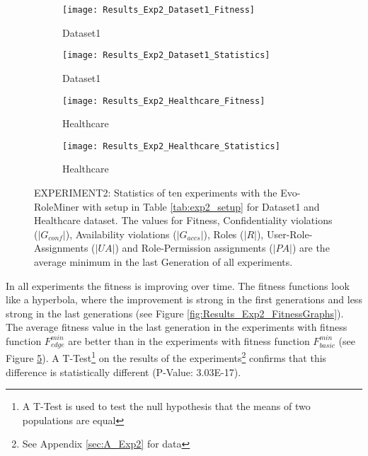\begin{figure}[H]
	\centering
	\begin{subfigure}{0.45\textwidth}
		\texttt{[image: Results\_Exp2\_Dataset1\_Fitness]}
		\caption{Dataset1}
		\label{fig:Results_Exp2_Dataset1_Fitness}
	\end{subfigure}%
	\begin{subfigure}{0.55\textwidth}
		\centering
		\texttt{[image: Results\_Exp2\_Dataset1\_Statistics]}
		\caption{Dataset1}
		\label{fig:Results_Exp2_Dataset1_Statistics}
	\end{subfigure}
	\begin{subfigure}{0.45\textwidth}
		\texttt{[image: Results\_Exp2\_Healthcare\_Fitness]}
		\caption{Healthcare}
		\label{fig:Results_Exp2_Healthcare_Fitness}
	\end{subfigure}%
	\begin{subfigure}{0.55\textwidth}
		\centering
		\texttt{[image: Results\_Exp2\_Healthcare\_Statistics]}
		\caption{Healthcare}
		\label{fig:Results_Exp2_Healthcare_Statistics}
	\end{subfigure}
	\caption{EXPERIMENT2: Statistics of ten experiments with the Evo-RoleMiner with setup in Table \ref{tab:exp2_setup} for Dataset1 and Healthcare dataset. The values for Fitness, Confidentiality violations ($|G_{conf}|$), Availability violations ($|G_{accs}|$), Roles ($|R|$), User-Role-Assignments ($|UA|$) and Role-Permission assignments ($|PA|$) are the average minimum in the last Generation of all experiments.}
	\label{fig:Results_Exp2}
\end{figure}

In all experiments the fitness is improving over time. The fitness functions look like a hyperbola, where the improvement is strong in the first generations and less strong in the last generations (see Figure \ref{fig:Results_Exp2_FitnessGraphs}). The average fitness value in the last generation in the experiments with fitness function $F_{edge}^{min}$ are better than in the experiments with fitness function $F_{basic}^{min}$ (see Figure \ref{fig:Results_Exp2}). A T-Test\footnote{A T-Test is used to test the null hypothesis that the means of two populations are equal} on the results of the experiments\footnote{See Appendix \ref{sec:A_Exp2} for data} confirms that this difference is statistically different (P-Value: 3.03E-17).

